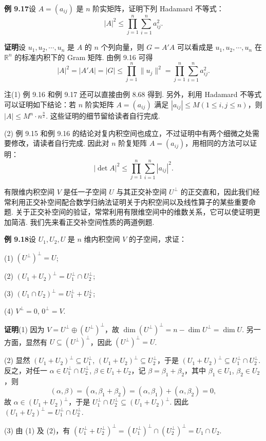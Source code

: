 \documentclass[UTF8,12pt,a4paper,fontset=fandol]{ctexart}
\begin{document}
\noindent\textbf{例 9.17}\quad 设 $A=(a_{ij})$ 是 $n$ 阶实矩阵，证明下列 Hadamard 不等式：
\[
|A|^2\le \prod_{j=1}^n\sum_{i=1}^n a_{ij}^2.
\]

\noindent\textbf{证明}\quad 设 $u_1,u_2,\cdots,u_n$ 是 $A$ 的 $n$ 个列向量，则 $G=A'A$ 可以看成是 $u_1,u_2,\cdots,u_n$ 在 $\mathbb{R}^n$ 的标准内积下的 Gram 矩阵. 由例 9.16 可得
\[
|A|^2=|A'A|=|G|\le \prod_{j=1}^n\|u_j\|^2=\prod_{j=1}^n\sum_{i=1}^n a_{ij}^2.
\]

注\quad (1) 例 9.16 和例 9.17 还可以直接由例 8.68 得到. 另外，利用 Hadamard 不等式可以证明如下结论：若 $n$ 阶实矩阵 $A=(a_{ij})$ 满足 $|a_{ij}|\le M(1\le i,j\le n)$，则 $|A|\le M^n\cdot n^{\frac n2}$. 这些证明的细节留给读者自行完成.

(2) 例 9.15 和例 9.16 的结论对复内积空间也成立，不过证明中有两个细微之处需要修改，请读者自行完成. 因此对 $n$ 阶复矩阵 $A=(a_{ij})$，用相同的方法可以证明：
\[
|\det A|^2\le \prod_{j=1}^n\sum_{i=1}^n |a_{ij}|^2.
\]

有限维内积空间 $V$ 是任一子空间 $U$ 与其正交补空间 $U^\perp$ 的正交直和，因此我们经常利用正交补空间配合数学归纳法证明关于内积空间以及线性算子的某些重要命题. 关于正交补空间的验证，常常利用有限维空间中的维数关系，它可以使证明更加简洁. 我们先来看正交补空间性质的两道例题.

\noindent\textbf{例 9.18}\quad 设 $U_1,U_2,U$ 是 $n$ 维内积空间 $V$ 的子空间，求证：

(1) $(U^\perp)^\perp=U$;

(2) $(U_1+U_2)^\perp=U_1^\perp\cap U_2^\perp$;

(3) $(U_1\cap U_2)^\perp=U_1^\perp+U_2^\perp$;

(4) $V^\perp=0$, $0^\perp=V$.

\noindent\textbf{证明}\quad (1) 因为 $V=U^\perp\oplus (U^\perp)^\perp$，故 $\dim(U^\perp)^\perp=n-\dim U^\perp=\dim U$. 另一方面，显然有 $U\subseteq (U^\perp)^\perp$，因此 $(U^\perp)^\perp=U$.

(2) 显然 $(U_1+U_2)^\perp\subseteq U_1^\perp$, $(U_1+U_2)^\perp\subseteq U_2^\perp$，于是 $(U_1+U_2)^\perp\subseteq U_1^\perp\cap U_2^\perp$. 反之，对任一 $\alpha\in U_1^\perp\cap U_2^\perp$, $\beta\in U_1+U_2$，记 $\beta=\beta_1+\beta_2$，其中 $\beta_1\in U_1$, $\beta_2\in U_2$，则
\[
(\alpha,\beta)=(\alpha,\beta_1+\beta_2)=(\alpha,\beta_1)+(\alpha,\beta_2)=0,
\]
故 $\alpha\in (U_1+U_2)^\perp$，于是 $U_1^\perp\cap U_2^\perp\subseteq (U_1+U_2)^\perp$. 因此 $(U_1+U_2)^\perp=U_1^\perp\cap U_2^\perp$.

(3) 由 (1) 及 (2)，有 $(U_1^\perp+U_2^\perp)^\perp=(U_1^\perp)^\perp\cap (U_2^\perp)^\perp=U_1\cap U_2$.
\end{document}
